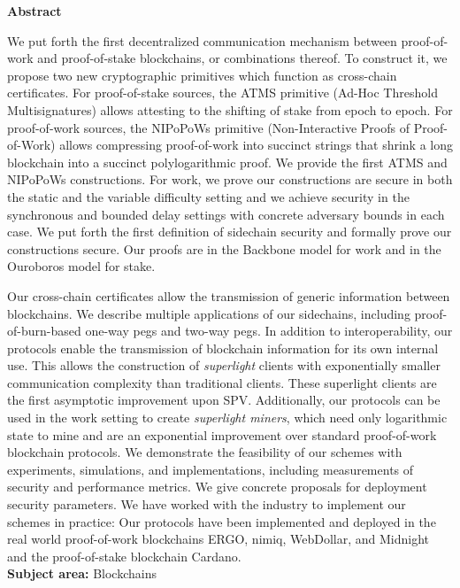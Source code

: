 \begin{center}%
  {\bfseries Abstract}%
\end{center}%

We put forth the first decentralized communication mechanism
between proof-of-work and proof-of-stake blockchains, or combinations thereof.
To construct it, we propose two new cryptographic primitives
which function as cross-chain certificates. For proof-of-stake sources, the ATMS
primitive (Ad-Hoc Threshold Multisignatures) allows attesting to the shifting of
stake from epoch to epoch. For proof-of-work sources, the NIPoPoWs primitive
(Non-Interactive Proofs of Proof-of-Work) allows compressing proof-of-work into
succinct strings that shrink a long blockchain into a succinct polylogarithmic
proof. We provide the first ATMS and NIPoPoWs constructions. For work, we prove
our constructions are secure in both the static and the variable difficulty
setting and we achieve security in the synchronous and bounded delay settings
with concrete adversary bounds in each case. We put forth the first definition
of sidechain security and formally prove our constructions secure. Our proofs
are in the Backbone model for work and in the Ouroboros model for stake.

Our cross-chain certificates allow the transmission of generic information
between blockchains. We describe multiple applications of our sidechains,
including proof-of-burn-based one-way pegs and two-way pegs.
In addition to interoperability, our protocols enable the transmission of
blockchain information for its own internal use. This allows the construction of
\emph{superlight} clients with exponentially smaller communication complexity
than traditional clients. These superlight clients are the first asymptotic
improvement upon SPV. Additionally, our protocols can be used in the work
setting to create \emph{superlight miners}, which need only logarithmic state
to mine and are an exponential improvement over standard proof-of-work
blockchain protocols. We demonstrate the feasibility of our schemes with
experiments, simulations, and implementations, including measurements of
security and performance metrics. We give concrete proposals for deployment
security parameters. We have worked with the industry to implement our schemes
in practice: Our protocols have been implemented and deployed in the real world
proof-of-work blockchains ERGO, nimiq, WebDollar, and Midnight and the
proof-of-stake blockchain Cardano.\\

\ifuniversity
\noindent
\textbf{Subject area:} Blockchains


